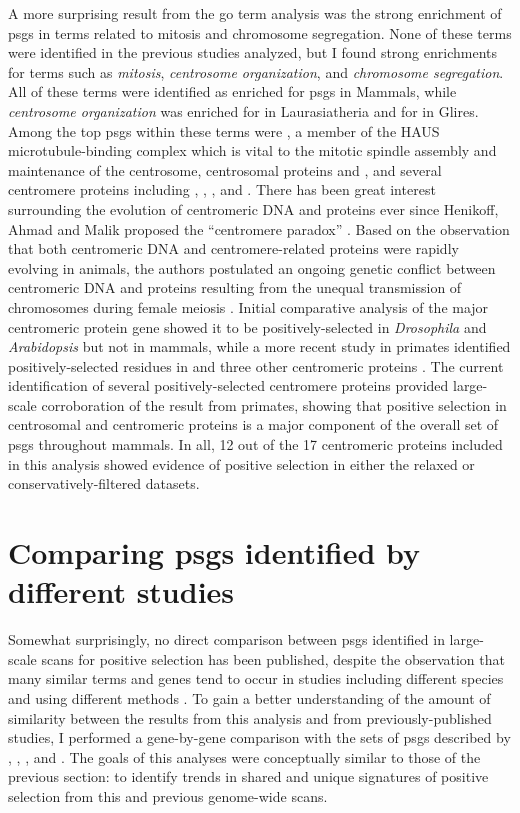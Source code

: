 A more surprising result from the \ac{go} term analysis was the strong
enrichment of \acp{psg} in terms related to mitosis and chromosome
segregation. None of these terms were identified in the previous
studies analyzed, but I found strong enrichments for terms such as
\emph{mitosis}, \emph{centrosome organization}, and \emph{chromosome
  segregation}. All of these terms were identified as enriched for
\psgeone \acp{psg} in Mammals, while \emph{centrosome organization}
was enriched for \psgeone in Laurasiatheria and for \psgefive in
Glires. Among the top \acp{psg} within these terms were ,
a member of the HAUS microtubule-binding complex which is vital to the
mitotic spindle assembly and maintenance of the centrosome,
centrosomal proteins  and , and several
centromere proteins including , ,
, and . There has been great interest
surrounding the evolution of centromeric DNA and proteins ever since
Henikoff, Ahmad and Malik proposed the ``centromere paradox''
\citeyearpar{Henikoff2001}. Based on the observation that both
centromeric DNA and centromere-related proteins were rapidly evolving
in animals, the authors postulated an ongoing genetic conflict between
centromeric DNA and proteins resulting from the unequal transmission
of chromosomes during female meiosis
\citep{Henikoff2001,Malik2002,Malik2009}. Initial comparative analysis
of the major centromeric protein  gene showed it to be
positively-selected in \emph{Drosophila} and \emph{Arabidopsis} but
not in mammals, while a more recent study in primates identified
positively-selected residues in  and three other
centromeric proteins \citep{Schueler2010}. The current identification
of several positively-selected centromere proteins provided
large-scale corroboration of the result from primates, showing that
positive selection in centrosomal and centromeric proteins is a major
component of the overall set of \acp{psg} throughout mammals. In all,
12 out of the 17 centromeric proteins included in this analysis showed
evidence of positive selection in either the relaxed or
conservatively-filtered datasets.

\section{Comparing \acp{psg} identified by different studies}

Somewhat surprisingly, no direct comparison between \acp{psg}
identified in large-scale scans for positive selection has been
published, despite the observation that many similar terms and genes
tend to occur in studies including different species and using
different methods \citep{Nielsen2005,Kosiol2008}. To gain a better
understanding of the amount of similarity between the results from
this analysis and from previously-published studies, I performed a
gene-by-gene comparison with the sets of \acp{psg} described by
\citet{Clark2003}, \citet{Nielsen2005}, \citet{Macaque2007}, and
\citet{Kosiol2008}. The goals of this analyses were conceptually
similar to those of the previous section: to identify trends in shared
and unique signatures of positive selection from this and previous
genome-wide scans.

